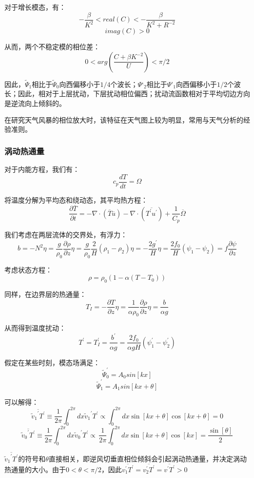 \documentclass{article}
\begin{document}
对于增长模态，有：
$$-\frac{\beta}{K^2}<real(C)<-\frac{\beta}{K^2+R^{-2}}$$
$$imag(C)>0$$

从而，两个不稳定模的相位差：
$$0<arg(\frac{C +\beta K^{-2}}{U})<\pi/2$$

因此，$\tilde{\Psi}_1$相比于$\tilde{\Psi}_0$向西偏移小于$1/4$个波长；$\Psi‘_2$相比于$\Psi’_1$向西偏移小于$1/2$个波长；因此，相对于上层扰动，下层扰动相位偏西；扰动流函数相对于平均切边方向是逆流向上倾斜的。

在研究天气风暴的相位放大时，该特征在天气图上较为明显，常用与天气分析的经验准则。

\subsubsection{涡动热通量}
对于内能方程，我们有：
$$c_p\frac{dT}{dt}=\Omega$$

将温度分解为平均态和绕动态，其平均热方程：
$$\frac{\partial \overline{T}}{\partial t}=-\nabla \cdot (\overline{T}\overline{u})-\nabla \cdot (\overline{{T}^{\prime}{u}^{\prime}})+\frac{1}{{{C}_{p}}}\overline{\Omega }$$

我们考虑在两层流体的交界处，有浮力：
$$b = -N^2\eta = \frac{g}{\rho_0}\frac{\partial \rho}{\partial z}\eta = \frac{g}{\rho_0}\frac{2}{H}(\rho_1-\rho_2)\eta=-\frac{2g^{\prime}}{H}\eta =\frac{2f_0}{H}(\psi_1-\psi_2)=f\frac{\partial \psi}{\partial z} $$

考虑状态方程：
$$\rho = \rho_0(1-\alpha(T-T_0))$$

同样，在边界层的热通量：
$$T_I = -\frac{\partial T}{\partial z}\eta = \frac{1}{\alpha\rho_0}\frac{\partial \rho}{\partial z}\eta = \frac{b}{\alpha g }$$

从而得到温度扰动：
$$T^{\prime} = T_I^{\prime} = \frac{b^{\prime}}{\alpha g} = \frac{2f_0}{\alpha gH}(\psi_1^{\prime}-\psi_2^{\prime})$$

假定在某些时刻，模态场满足：
$$\tilde{\Psi}_0^{\prime} = A_0sin[kx]$$
$$\tilde{\Psi}_1^{\prime} = A_1sin[kx+\theta]$$

可以解得：
$$\overline{{{\widetilde{v}}_{1}}^{\prime }{T}^{\prime}}\equiv \frac{1}{2\pi }\int_{0}^{2\pi }{dx}{{\widetilde{v}}_{1}}^{\prime }{T}^{\prime}\propto \int_{0}^{2\pi }{dx}\sin [kx+\theta ]\cos [kx+\theta ]=0$$
$$\overline{{{\widetilde{v}}_{0}}^{\prime }{T}^{\prime}}\equiv \frac{1}{2\pi }\int_{0}^{2\pi }{dx}{{\widetilde{v}}_{0}}^{\prime }{T}^{\prime}\overset{}{\mathop{\propto }}\,\frac{1}{2\pi }\int_{0}^{2\pi }{dx}\sin [kx+\theta ]\cos [kx]=\frac{\sin [\theta ]}{2}$$

$\overline{{{\widetilde{v}}_{1}}^{\prime }{T}^{\prime}}$的符号和$\theta$直接相关，即逆风切垂直相位倾斜会引起涡动热通量，并决定涡动热通量的大小。由于$0<\theta<\pi/2$，因此$\overline{v_1^{\prime}T^{\prime}}=\overline{v_2^{\prime}T^{\prime}}=\overline{v^{\prime}T^{\prime}}>0$
\end{document}
